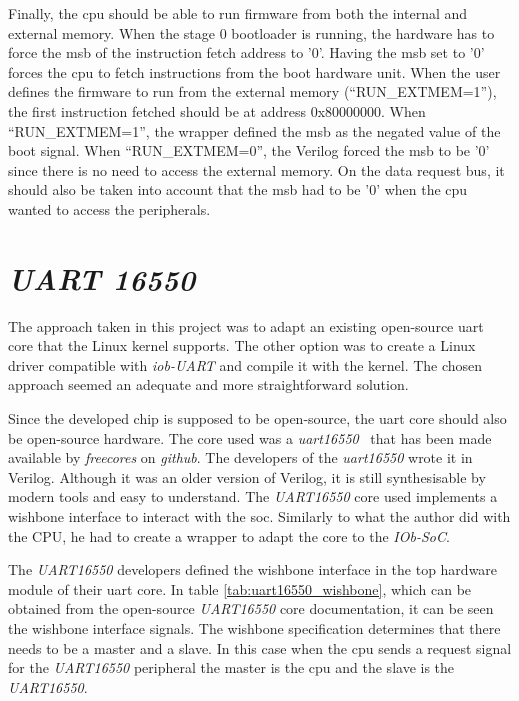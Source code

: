 Finally, the \acrshort{cpu} should be able to run firmware from both the internal and external memory. When the stage 0 bootloader is running, the hardware has to force the \acrfull{msb} of the instruction fetch address to '0'. Having the \acrshort{msb} set to '0' forces the \acrshort{cpu} to fetch instructions from the boot hardware unit. When the user defines the firmware to run from the external memory (\enquote{RUN\_EXTMEM=1}), the first instruction fetched should be at address 0x80000000. When \enquote{RUN\_EXTMEM=1}, the wrapper defined the \acrfull{msb} as the negated value of the boot signal. When \enquote{RUN\_EXTMEM=0}, the Verilog forced the \acrshort{msb} to be '0' since there is no need to access the external memory. On the data request bus, it should also be taken into account that the \acrshort{msb} had to be '0' when the \acrshort{cpu} wanted to access the peripherals.

\section{\textit{UART 16550}}
\label{section:uart}
The approach taken in this project was to adapt an existing open-source \acrfull{uart} core that the Linux kernel supports. The other option was to create a Linux driver compatible with \textit{iob-UART} and compile it with the kernel. The chosen approach seemed an adequate and more straightforward solution.

Since the developed chip is supposed to be open-source, the \acrshort{uart} core should also be open-source hardware. The core used was a \textit{\acrshort{uart}16550}~\cite{gorban2002uart} that has been made available by \textit{freecores} on \textit{github}. The developers of the \textit{\acrshort{uart}16550} wrote it in Verilog. Although it was an older version of Verilog, it is still synthesisable by modern tools and easy to understand. The \textit{UART16550} core used implements a wishbone interface to interact with the \acrfull{soc}. Similarly to what the author did with the CPU, he had to create a wrapper to adapt the core to the \textit{IOb-SoC}.

The \textit{UART16550} developers defined the wishbone interface in the top hardware module of their \acrshort{uart} core. In table \ref{tab:uart16550_wishbone}, which can be obtained from the open-source \textit{UART16550} core documentation, it can be seen the wishbone interface signals. The wishbone specification determines that there needs to be a master and a slave. In this case when the \acrshort{cpu} sends a request signal for the \textit{UART16550} peripheral the master is the \acrshort{cpu} and the slave is the \textit{UART16550}.

